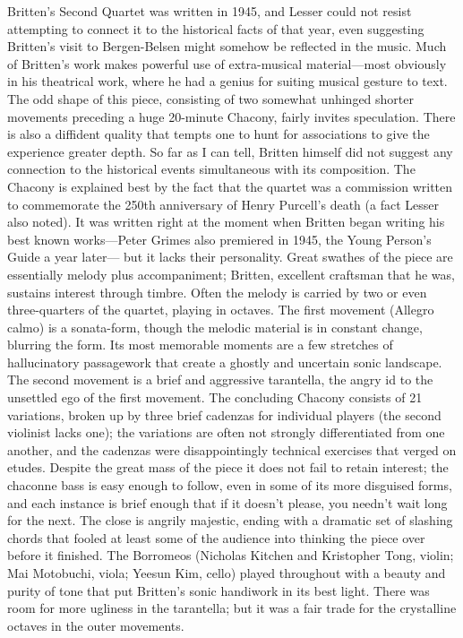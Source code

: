 Britten’s Second Quartet was written in 1945, and Lesser could not resist attempting to connect it to the historical facts of that year, even suggesting Britten’s visit to Bergen-Belsen might somehow be reflected in the music. Much of Britten’s work makes powerful use of extra-musical material—most obviously in his theatrical work, where he had a genius for suiting musical gesture to text. The odd shape of this piece, consisting of two somewhat unhinged shorter movements preceding a huge 20-minute Chacony, fairly invites speculation. There is also a diffident quality that tempts one to hunt for associations to give the experience greater depth. So far as I can tell, Britten himself did not suggest any connection to the historical events simultaneous with its composition. The Chacony is explained best by the fact that the quartet was a commission written to commemorate the 250th anniversary of Henry Purcell’s death (a fact Lesser also noted). It was written right at the moment when Britten began writing his best known works—Peter Grimes also premiered in 1945, the Young Person’s Guide a year later— but it lacks their personality. Great swathes of the piece are essentially melody plus accompaniment; Britten, excellent craftsman that he was, sustains interest through timbre. Often the melody is carried by two or even three-quarters of the quartet, playing in octaves. The first movement (Allegro calmo) is a sonata-form, though the melodic material is in constant change, blurring the form. Its most memorable moments are a few stretches of hallucinatory passagework that create a ghostly and uncertain sonic landscape. The second movement is a brief and aggressive tarantella, the angry id to the unsettled ego of the first movement. The concluding Chacony consists of 21 variations, broken up by three brief cadenzas for individual players (the second violinist lacks one); the variations are often not strongly differentiated from one another, and the cadenzas were disappointingly technical exercises that verged on etudes. Despite the great mass of the piece it does not fail to retain interest; the chaconne bass is easy enough to follow, even in some of its more disguised forms, and each instance is brief enough that if it doesn’t please, you needn’t wait long for the next. The close is angrily majestic, ending with a dramatic set of slashing chords that fooled at least some of the audience into thinking the piece over before it finished. The Borromeos (Nicholas Kitchen and Kristopher Tong, violin; Mai Motobuchi, viola; Yeesun Kim, cello) played throughout with a beauty and purity of tone that put Britten’s sonic handiwork in its best light. There was room for more ugliness in the tarantella; but it was a fair trade for the crystalline octaves in the outer movements.

